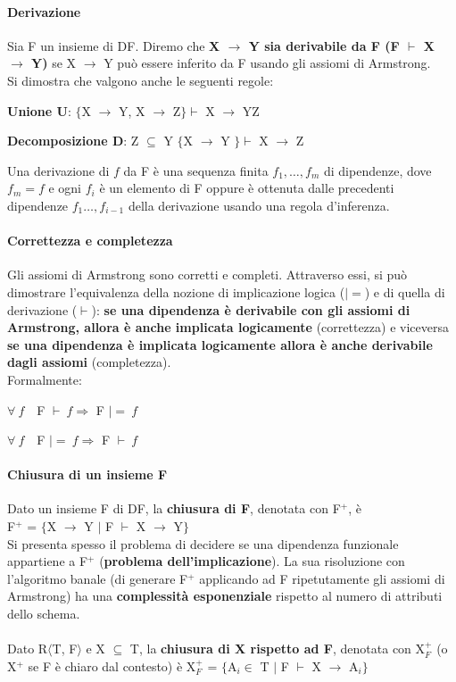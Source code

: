 \documentclass[10pt]{book}
\begin{document}
\paragraph{Derivazione} Sia F un insieme di DF. Diremo che \textbf{X $\rightarrow$ Y sia derivabile da F (F $\vdash$ X $\rightarrow$ Y)} se X $\rightarrow$ Y può essere inferito da F usando gli assiomi di Armstrong.\\
Si dimostra che valgono anche le seguenti regole:
\begin{list}{}{}
	\item \textbf{Unione U}: $\{$X $\rightarrow$ Y, X $\rightarrow$ Z$\}\vdash$ X $\rightarrow$ YZ
	\item \textbf{Decomposizione D}: Z $\subseteq$ Y $\{$X $\rightarrow$ Y $\}\vdash$ X $\rightarrow$ Z
\end{list}
Una derivazione di $f$ da F è una sequenza finita $f_1,\ldots,f_m$ di dipendenze, dove $f_m = f$ e ogni $f_i$ è un elemento di F oppure è ottenuta dalle precedenti dipendenze $f_1\ldots,f_{i-1}$ della derivazione usando una regola d'inferenza.
\paragraph{Correttezza e completezza} Gli assiomi di Armstrong sono corretti e completi. Attraverso essi, si può dimostrare l'equivalenza della nozione di implicazione logica ($|=$) e di quella di derivazione ($\vdash$): \textbf{se una dipendenza è derivabile con gli assiomi di Armstrong, allora è anche implicata logicamente} (correttezza) e viceversa \textbf{se una dipendenza è implicata logicamente allora è anche derivabile dagli assiomi} (completezza).\\
Formalmente:
\begin{list}{}{}
	\item $\forall\:f\:\:\:$ F $\vdash\:f\Rightarrow$ F $|=\:f$
	\item $\forall\:f\:\:\:$ F $|=\:f\Rightarrow$ F $\vdash\:f$
\end{list}
\paragraph{Chiusura di un insieme F} Dato un insieme F di DF, la \textbf{chiusura di F}, denotata con F$^+$, è\\F$^+$ = $\{$X $\rightarrow$ Y $|$ F $\vdash$ X $\rightarrow$ Y$\}$\\
Si presenta spesso il problema di decidere se una dipendenza funzionale appartiene a F$^+$ (\textbf{problema dell'implicazione}). La sua risoluzione con l'algoritmo banale (di generare F$^+$ applicando ad F ripetutamente gli assiomi di Armstrong) ha una \textbf{complessità esponenziale} rispetto al numero di attributi dello schema.\\\\
Dato R$\langle$T, F$\rangle$ e X $\subseteq$ T, la \textbf{chiusura di X rispetto ad F}, denotata con X$_F^+$ (o X$^+$ se F è chiaro dal contesto) è X$_F^+$ = $\{$A$_i\in$ T $|$ F $\vdash$ X $\rightarrow$ A$_i\}$
\end{document}
